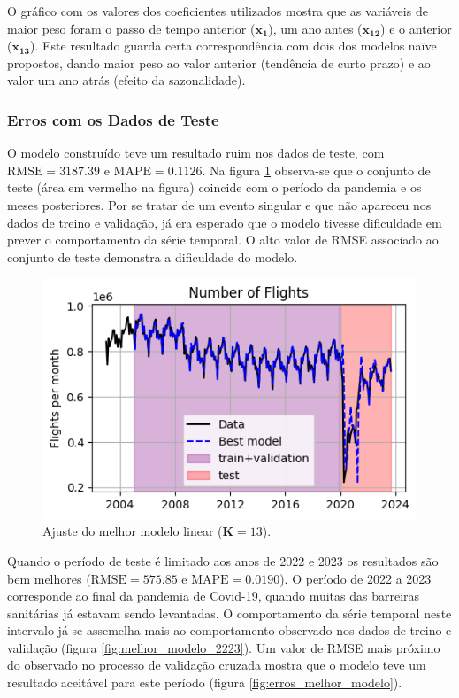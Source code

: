 \documentclass[final,5p]{elsarticle}
\numberwithin{equation}{section}
\begin{document}
    O gráfico com os valores dos coeficientes utilizados mostra que as variáveis de maior peso foram o passo de tempo anterior ($\textbf{x}_{\textbf{1}}$), um ano antes ($\textbf{x}_{\textbf{12}}$) e o anterior ($\textbf{x}_{\textbf{13}}$). Este resultado guarda certa correspondência com dois dos modelos naïve propostos, dando maior peso ao valor anterior (tendência de curto prazo) e ao valor um ano atrás (efeito da sazonalidade).

    \subsubsection{Erros com os Dados de Teste} \label{sec:testes_modelo}

    O modelo construído teve um resultado ruim nos dados de teste, com $\text{RMSE} = 3187.39$ e $\text{MAPE} = 0.1126$. Na figura \ref{fig:melhor_modelo_teste} observa-se que o conjunto de teste (área em vermelho na figura) coincide com o período da pandemia e os meses posteriores. Por se tratar de um evento singular e que não apareceu nos dados de treino e validação, já era esperado que o modelo tivesse dificuldade em prever o comportamento da série temporal. O alto valor de RMSE associado ao conjunto de teste demonstra a dificuldade do modelo.

    \begin{figure}[hbt!]
        \includegraphics[width=0.95\columnwidth]{B2_BestModelFit.png}
        \caption{Ajuste do melhor modelo linear ($\textbf{K} = 13$).}
        \label{fig:melhor_modelo_teste}
    \end{figure}

    Quando o período de teste é limitado aos anos de 2022 e 2023 os resultados são bem melhores ($\text{RMSE} = 575.85$ e $\text{MAPE} = 0.0190$). O período de 2022 a 2023 corresponde ao final da pandemia de Covid-19, quando muitas das barreiras sanitárias já estavam sendo levantadas. O comportamento da série temporal neste intervalo já se assemelha mais ao comportamento observado nos dados de treino e validação (figura \ref{fig:melhor_modelo_2223}). Um valor de RMSE mais próximo do observado no processo de validação cruzada mostra que o modelo teve um resultado aceitável para este período (figura \ref{fig:erros_melhor_modelo}).
\end{document}
